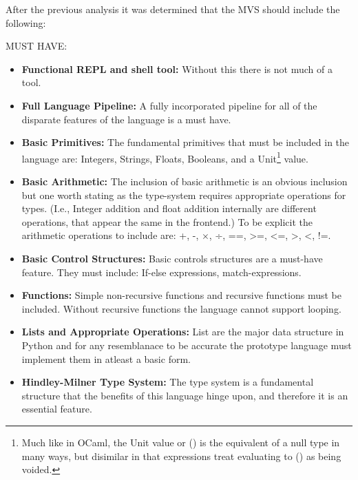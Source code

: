\documentclass{l4proj}
\begin{document}
After the previous analysis it was determined that the MVS should include the following:

MUST HAVE:
\begin{itemize}
    \item \textbf{Functional REPL and shell tool:} Without this there is not much of a tool.
    \item \textbf{Full Language Pipeline:} A fully incorporated pipeline for all of the disparate features of the language is a must have.
    \item \textbf{Basic Primitives:} The fundamental primitives that must be included in the language are: Integers, Strings, Floats, Booleans, and a Unit\footnote{Much like in OCaml, the Unit value or () is the equivalent of a null type in many ways, but disimilar in that expressions treat evaluating to () as being voided.} value.
    \item \textbf{Basic Arithmetic:} The inclusion of basic arithmetic is an obvious inclusion but one worth stating as the type-system requires appropriate operations for types.
    (I.e., Integer addition and float addition internally are different operations, that appear the same in the frontend.)
    To be explicit the arithmetic operations to include are: +, -, $\times$, ÷, ==, >=, <=, >, <, !=.
    \item \textbf{Basic Control Structures:} Basic controls structures are a must-have feature. They must include: If-else expressions, match-expressions.
    \item \textbf{Functions:} Simple non-recursive functions and recursive functions must be included. Without recursive functions the language cannot support looping.
    \item \textbf{Lists and Appropriate Operations:} List are the major data structure in Python and for any resemblanace to be accurate the prototype language must implement them in atleast a basic form.
    \item \textbf{Hindley-Milner Type System:} The type system is a fundamental structure that the benefits of this language hinge upon, and therefore it is an essential feature.
\end{itemize}
\end{document}
